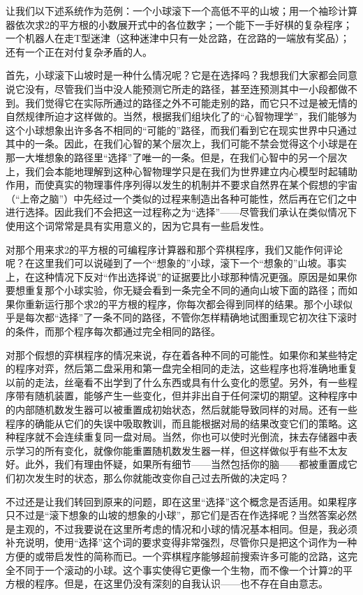 让我们以下述系统作为范例：一个小球滚下一个高低不平的山坡；用一个袖珍计算器依次求2的平方根的小数展开式中的各位数字；一个能下一手好棋的复杂程序；一个机器人在走T型迷津（这种迷津中只有一处岔路，在岔路的一端放有奖品）；还有一个正在对付复杂矛盾的人。

首先，小球滚下山坡时是一种什么情况呢？它是在选择吗？我想我们大家都会同意说它没有，尽管我们当中没人能预测它所走的路径，甚至连预测其中一小段都做不到。我们觉得它在实际所通过的路径之外不可能走别的路，而它只不过是被无情的自然规律所迫才这样做的。当然，根据我们组块化了的“心智物理学”，我们能够为这个小球想象出许多各不相同的“可能的”路径，而我们看到它在现实世界中只通过其中的一条。因此，在我们心智的某个层次上，我们可能不禁会觉得这个小球是在那一大堆想象的路径里“选择”了唯一的一条。但是，在我们心智中的另一个层次上，我们会本能地理解到这种心智物理学只是在我们为世界建立内心模型时起辅助作用，而使真实的物理事件序列得以发生的机制并不要求自然界在某个假想的宇宙（“上帝之脑”）中先经过一个类似的过程来制造出各种可能性，然后再在它们之中进行选择。因此我们不会把这一过程称之为“选择”——尽管我们承认在类似情况下使用这个词常常是具有实用意义的，因为它具有一些启发性。

对那个用来求2的平方根的可编程序计算器和那个弈棋程序，我们又能作何评论呢？在这里我们可以说碰到了一个“想象的”小球，滚下一个“想象的”山坡。事实上，在这种情况下反对“作出选择说”的证据要比小球那种情况更强。原因是如果你要想重复那个小球实验，你无疑会看到一条完全不同的通向山坡下面的路径；而如果你重新运行那个求2的平方根的程序，你每次都会得到同样的结果。那个小球似乎是每次都“选择”了一条不同的路径，不管你怎样精确地试图重现它初次往下滚时的条件，而那个程序每次都通过完全相同的路径。

对那个假想的弈棋程序的情况来说，存在着各种不同的可能性。如果你和某些特定的程序对弈，然后第二盘采用和第一盘完全相同的走法，这些程序也将准确地重复以前的走法，丝毫看不出学到了什么东西或具有什么变化的愿望。另外，有一些程序带有随机装置，能够产生一些变化，但并非出自于任何深切的期望。这种程序中的内部随机数发生器可以被重置成初始状态，然后就能导致同样的对局。还有一些程序的确能从它们的失误中吸取教训，而且能根据对局的结果改变它们的策略。这种程序就不会连续重复同一盘对局。当然，你也可以使时光倒流，抹去存储器中表示学习的所有变化，就像你能重置随机数发生器一样，但这样做似乎有些不太友好。此外，我们有理由怀疑，如果所有细节——当然包括你的脑——都被重置成它们初次发生时的状态，那么你就能改变你自己过去所做的决定吗？

不过还是让我们转回到原来的问题，即在这里“选择”这个概念是否适用。如果程序只不过是“滚下想象的山坡的想象的小球”，那它们是否在作选择呢？当然答案必然是主观的，不过我要说在这里所考虑的情况和小球的情况基本相同。但是，我必须补充说明，使用“选择”这个词的要求变得非常强烈，尽管你只是把这个词作为一种方便的或带启发性的简称而已。一个弈棋程序能够超前搜索许多可能的岔路，这完全不同于一个滚动的小球。这个事实使得它更像一个生物，而不像一个计算2的平方根的程序。但是，在这里仍没有深刻的自我认识——也不存在自由意志。

